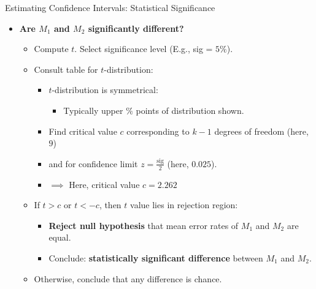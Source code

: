 \begin{frame}{Estimating Confidence Intervals: Statistical Significance}
	\begin{itemize}
		\item \textbf{Are $M_1$ and $M_2$ {\color{airforceblue} significantly different}?}
		      \begin{itemize}
			      \item Compute $t$. Select significance level (E.g., sig = $5 \%$).
			      \item Consult table for $t$-distribution:
			            \begin{itemize}
				            \item $t$-distribution is symmetrical:
				                  \begin{itemize}
					                  \item Typically upper $\%$ points of distribution shown.
				                  \end{itemize}
				            \item Find critical value $c$ corresponding to $k-1$ degrees of freedom (here, $9$)
				            \item and for confidence limit $z = \frac{\text{sig}}{2}$ (here, $0.025$).
				            \item $\implies$ Here, critical value $c = 2.262$
			            \end{itemize}
			      \item If $t > c$ or $t < -c$, then $t$ value lies in rejection region:
			            \begin{itemize}
				            \item \textbf{Reject null hypothesis} that mean error rates of $M_1$ and $M_2$ are equal.
				            \item Conclude: \textbf{statistically significant difference} between $M_1$ and $M_2$.
			            \end{itemize}
			      \item Otherwise, conclude that any difference is chance.
		      \end{itemize}
	\end{itemize}
\end{frame}

